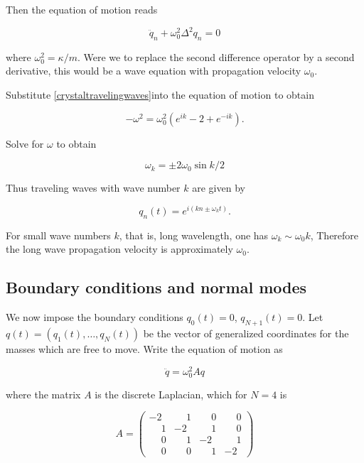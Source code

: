 Then the equation of motion reads

\begin{equation}
\label{onedcrystaleqmolaplacian}
\ddot q_n + \omega_0^2 \Delta^2 q_n = 0
\end{equation}

where $\omega_0^2 = \kappa/m$. Were we to replace the second difference operator by a second derivative, this would be a wave equation with propagation velocity $\omega_0$.


Substitute \eqref{crystaltravelingwaves}into the equation of motion to obtain

\begin{equation}
-\omega^2 = \omega_0^2( e^{ik} - 2 + e^{-ik} ).
\end{equation}

Solve for $\omega$ to obtain  

\begin{equation}
\omega_k = \pm 2\omega_0\sin k/2 
\end{equation}

Thus traveling waves with wave number $k$ are given by

\begin{equation}
q_n(t) = e^{ i(kn \pm \omega_k t)}.
\end{equation}

For small wave numbers $k$, that is, long wavelength, one has $\omega_k \sim \omega_0k$, Therefore the long wave propagation velocity is approximately $\omega_0$.

\subsection{Boundary conditions and normal modes}

We now impose the boundary conditions $q_0(t) = 0$, $q_{N+1}(t) = 0$.  Let $q(t) = (q_1(t), \ldots, q_N(t))$ be the vector of generalized coordinates for the masses which are free to move. Write the equation of motion as 

\begin{equation}
\ddot q = \omega_0^2 Aq
\end{equation}

where the matrix $A$ is the discrete Laplacian, which for $N = 4$ is

\begin{equation}
A = 
\begin{pmatrix}
-2 & \phantom{-}1 &  \phantom{-}0 &  \phantom{-}0 \\
 \phantom{-}1 & -2 &  \phantom{-}1 &  \phantom{-}0 \\
 \phantom{-}0 &  \phantom{-}1 & -2 &  \phantom{-}1 \\
 \phantom{-}0 &  \phantom{-}0 &  \phantom{-}1 & -2 
\end{pmatrix}
\end{equation}


